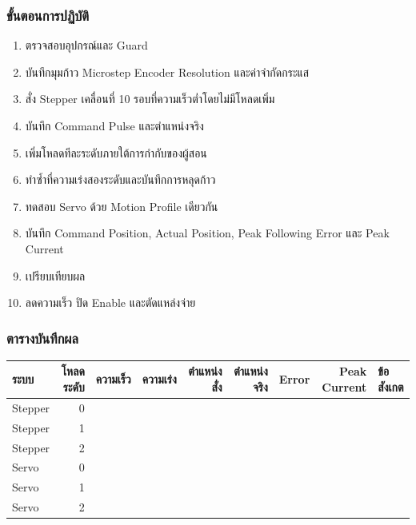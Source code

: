 \subsubsection{ขั้นตอนการปฏิบัติ}

\begin{enumerate}
    \item ตรวจสอบอุปกรณ์และ Guard
    \item บันทึกมุมก้าว Microstep Encoder Resolution และค่าจำกัดกระแส
    \item สั่ง Stepper เคลื่อนที่ 10 รอบที่ความเร็วต่ำโดยไม่มีโหลดเพิ่ม
    \item บันทึก Command Pulse และตำแหน่งจริง
    \item เพิ่มโหลดทีละระดับภายใต้การกำกับของผู้สอน
    \item ทำซ้ำที่ความเร่งสองระดับและบันทึกการหลุดก้าว
    \item ทดสอบ Servo ด้วย Motion Profile เดียวกัน
    \item บันทึก Command Position, Actual Position, Peak Following Error และ Peak Current
    \item เปรียบเทียบผล
    \item ลดความเร็ว ปิด Enable และตัดแหล่งจ่าย
\end{enumerate}

\subsubsection{ตารางบันทึกผล}

\begin{table}[htbp]
    \centering
    \begin{tabular}{l r r r r r r r l}
        \hline
        \textbf{ระบบ} & \textbf{โหลดระดับ} & \textbf{ความเร็ว} & \textbf{ความเร่ง} & \textbf{ตำแหน่งสั่ง} & \textbf{ตำแหน่งจริง} & \textbf{Error} & \textbf{Peak Current} & \textbf{ข้อสังเกต} \\
        \hline
        Stepper & 0 &  &  &  &  &  &  &  \\
        Stepper & 1 &  &  &  &  &  &  &  \\
        Stepper & 2 &  &  &  &  &  &  &  \\
        Servo & 0 &  &  &  &  &  &  &  \\
        Servo & 1 &  &  &  &  &  &  &  \\
        Servo & 2 &  &  &  &  &  &  &  \\
        \hline
    \end{tabular}
\end{table}

